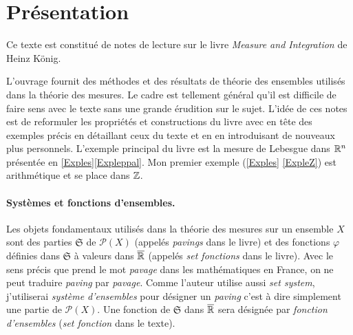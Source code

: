 


\section{Présentation}
\noindent Ce texte est constitué de notes de lecture sur le livre \emph{Measure and Integration} de Heinz König.

\noindent L'ouvrage fournit des méthodes et des résultats de théorie des ensembles utilisés dans la théorie des mesures. Le cadre est tellement général qu'il est difficile de faire sens avec le texte sans une grande érudition sur le sujet. L'idée de ces notes est de reformuler les propriétés et constructions du livre avec en tête des exemples précis en détaillant ceux du texte et en en introduisant de nouveaux plus personnels.\newline
L'exemple principal du livre est la mesure de Lebesgue dans $\mathbb{R}^n$ présentée en \ref{Exples}\ref{Expleppal}. Mon premier exemple (\ref{Exples} \ref{ExpleZ}) est arithmétique et se place dans $\mathbb{Z}$.

\paragraph*{Systèmes et fonctions d'ensembles.}
Les objets fondamentaux utilisés dans la théorie des mesures sur un ensemble $X$ sont des parties $\mathfrak{S}$ de $\mathcal{P}(X)$ (appelés \emph{pavings} dans le livre) et des fonctions $\varphi$ définies dans $\mathfrak{S}$ à valeurs dans $\overline{\mathbb{R}}$ (appelés \emph{set fonctions} dans le livre).\newline
Avec le sens précis que prend le mot \emph{pavage} dans les mathématiques en France, on ne peut traduire \emph{paving} par \emph{pavage}. Comme l'auteur utilise aussi \emph{set system}, j'utiliserai \emph{système d'ensembles} pour désigner un \emph{paving} c'est à dire simplement une partie de $\mathcal{P}(X)$.\newline
Une fonction de $\mathfrak{S}$ dans $\overline{\mathbb{R}}$ sera désignée par \emph{fonction d'ensembles} (\emph{set fonction} dans le texte).

